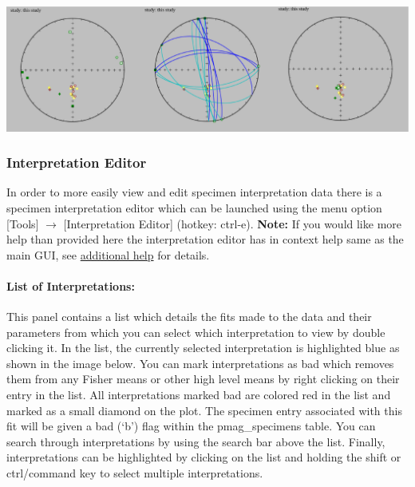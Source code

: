 \documentclass[11pt]{book}
\begin{document}
{{\includegraphics[width=30 cm]{EPSFiles/demag_gui_HLMTypes.eps}

\subsubsection{Interpretation Editor}\label{interpretation-editor} %

In order to more easily view and edit specimen interpretation data there is a specimen interpretation editor which can be launched using the menu option [Tools] $\rightarrow$ [Interpretation Editor] (hotkey: ctrl-e). \textbf{Note:} If you would like more help than provided here the interpretation editor has in context help same as the main GUI, see \hyperref[add-help]{additional help} for details.
\paragraph{List of Interpretations:}\label{IE-list} This panel contains a list which details the fits made to the data and their parameters from which you can select which interpretation to view by double clicking it. In the list, the currently selected interpretation is highlighted blue as shown in the image below. You can mark interpretations as bad which removes them from any Fisher means or other high level means by right clicking on their entry in the list. All interpretations marked bad are colored red in the list and marked as a small diamond on the plot. The specimen entry associated with this fit will be given a bad (`b') flag within the pmag\_specimens table. You can search through interpretations by using the search bar above the list. Finally, interpretations can be highlighted by clicking on the list and holding the shift or ctrl/command key to select multiple interpretations.
}}
\end{document}
